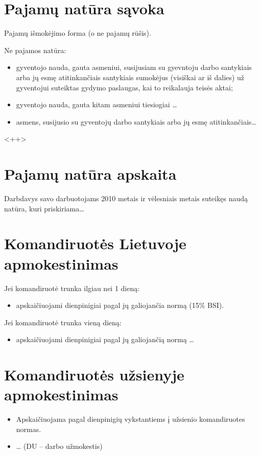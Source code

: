 \section{Pajamų natūra sąvoka}

\begin{defn}
  Pajamų išmokėjimo forma (o ne pajamų rūšis).
\end{defn}

Ne pajamos natūra:
\begin{itemize}
  \item gyventojo nauda, gauta asmeniui, susijusiam su gyevntoju darbo
    santykiais arba jų esmę atitinkančiais santykiais sumokėjus
    (visiškai ar iš dalies) už gyventojui suteiktas gydymo
    paslaugas, kai to reikalauja teisės aktai;
  \item gyventojo nauda, gauta kitam asmeniui tiesiogiai
    …
  \item asmens, susijusio su gyventojų darbo santykiais arba jų esmę
    atitinkančiais…
\end{itemize}<++>

\section{Pajamų natūra apskaita}

Darbdavys savo darbuotojams 2010 metais ir vėlesniais metais suteikęs naudą
natūra, kuri priskiriama…

\section{Komandiruotės Lietuvoje apmokestinimas}

Jei komandiruotė trunka ilgiau nei 1 dieną:
\begin{itemize}
  \item apskaičiuojami dienpinigiai pagal jų galiojančia normą
    (15\% BSI).
\end{itemize}
Jei komandiruotė trunka vieną dieną:
\begin{itemize}
  \item apskaičiuojami dienpinigiai pagal jų galiojančią normą
    …
\end{itemize}

\section{Komandiruotės užsienyje apmokestinimas}

\begin{itemize}
  \item Apskaičiuojama pagal dienpinigių vykstantiems į užsienio
    komandiruotes normas.
  \item …
    (DU – darbo užmokestis)
\end{itemize}

